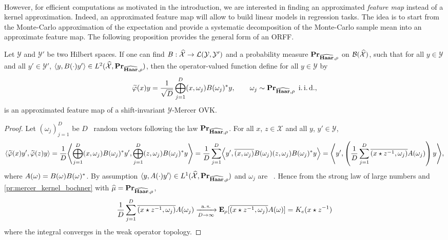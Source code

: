 \paragraph{}
However, for efficient computations as motivated in the introduction, we are interested in finding an approximated \emph{feature map} instead of a kernel approximation. Indeed, an approximated feature map will allow to build linear models in regression tasks. The idea is to start from the Monte-Carlo approximation of the expectation and provide a systematic decomposition of the Monte-Carlo sample mean into an approximate feature map. The following proposition provides the general form of an \acl{ORFF}.
\begin{proposition}[ORFF]
\label{pr:ORFF-map}
Let $\mathcal{Y}$ and $\mathcal{Y}'$ be two Hilbert spaces. If one can find $B: \widehat{\mathcal{X}} \to \mathcal{L}(\mathcal{Y},\mathcal{Y}')$ and a probability measure ${\mathbf{{Pr}}}_{\widehat{\mathbf{Haar}},\rho}$ on $\mathcal{B}(\widehat{\mathcal{X}})$, such that for all $y\in\mathcal{Y}$ and all $y'\in\mathcal{Y}'$, $\langle y, B(\cdot)y'\rangle \in L^2(\widehat{\mathcal{X}}, {\mathbf{{Pr}}}_{\widehat{\mathbf{Haar}},\rho})$, then the operator-valued function define for all $y\in\mathcal{Y}$ by
\begin{equation}
\label{eq:phitilde}
\tildePhi{1:D}(x)y= \frac{1}{\sqrt{D}}\Vect_{j=1}^D\pairing{x, \omega_j}B(\omega_j)^\adjoint y , \qquad \omega_j \sim \probability_{\dual{\Haar},\rho} \enskip\text{\iid},
\end{equation}
is an approximated feature map of a shift-invariant $\mathcal{Y}$-Mercer \acl{OVK}.
\end{proposition}
\begin{proof}
Let $(\omega_j)_{j=1}^D$ be $D$ \iid~random vectors following the law ${\mathbf{{Pr}}}_{\widehat{\mathbf{Haar}},\rho}$. For all $x$, $z \in \mathcal{X}$ and all $y$, $y' \in \mathcal{Y}$,
\begin{dmath*}
\inner*{\tildePhi{1:D}(x)y',\tildePhi{1:D}(z)y}=\frac{1}{D}\inner*{\Vect_{j=1}^D\pairing{x, \omega_j}B(\omega_j)^\adjoint y',  \Vect_{j=1}^D\pairing{z, \omega_j}B(\omega_j)^\adjoint y}
= \frac{1}{D} \sum_{j=1}^D \inner*{y', \conj{\pairing{x, \omega_j}}B(\omega_j)\pairing{z, \omega_j}B(\omega_j)^\adjoint y}
= \inner*{y', \left(\frac{1}{D} \sum_{j=1}^D \conj{\pairing{x\groupop \inv{z}, \omega_j}}A(\omega_j)\right)y},
\end{dmath*}
where $A(\omega)=B(\omega)B(\omega)^* $. By assumption $\langle y, A(\cdot)y'\rangle\in L^1(\widehat{\mathcal{X}},{\mathbf{{Pr}}}_{\widehat{\mathbf{Haar}},\rho})$ and $\omega_j$ are \iid~. Hence from the strong law of large numbers and \cref{pr:mercer_kernel_bochner} with $\widehat{\mu}={\mathbf{{Pr}}}_{\widehat{\mathbf{Haar}},\rho}$,
\begin{dmath*}
\frac{1}{D} \sum_{j=1}^D \conj{\pairing{x\groupop\inv{z},\omega_j}}A(\omega_j)\converges{\asurely}{D\to\infty}\expectation_{\rho}[\conj{\pairing{x\groupop z^{-1},\omega_j}}A(\omega)]=K_e(x\groupop\inv{z})
\end{dmath*}
where the integral converges in the weak operator topology.
\end{proof}

